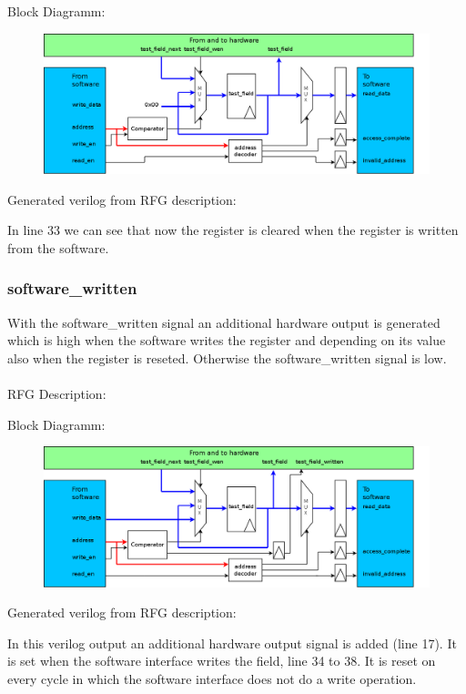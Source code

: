 \documentclass[12pt,a4paper]{article}
\begin{document}
Block Diagramm:
\begin{figure}[h!]
    \includegraphics[width=\textwidth]{pictures/Reg_hrw_srw_swrite_clear.png}
\end{figure}
\newpage
Generated verilog from RFG description:

In line 33 we can see that now the register is cleared when the register is written from the software.
\newpage

\subsubsection{software\_written}
With the software\_written signal an additional hardware output is generated which is high when the software writes the register and depending on its value also when the register is reseted. Otherwise the software\_written signal is low.\\
\\
RFG Description:


Block Diagramm:
\begin{figure}[h!]
    \includegraphics[width=\textwidth]{pictures/Reg_hrw_srw_swritten.png}
\end{figure}
\newpage
Generated verilog from RFG description:

In this verilog output an additional hardware output signal is added (line 17). It is set when the software interface writes the field, line 34 to 38. It is reset on every cycle in which the software interface does not do a write operation.
\newpage
\end{document}
